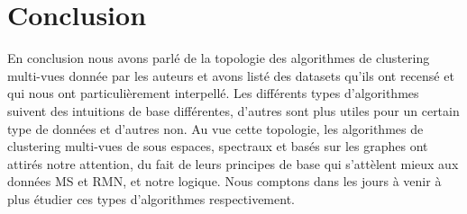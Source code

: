 \documentclass[12pt, french, latin.medieval, a4paper]{report}
\begin{document}
    \section{Conclusion}
    En conclusion nous avons parlé de la topologie des algorithmes de clustering multi-vues donnée par les auteurs et avons listé des datasets qu'ils ont recensé et qui nous ont particulièrement interpellé. Les différents types d'algorithmes suivent des intuitions de base différentes, d'autres sont plus utiles pour un certain type de données et d'autres non. Au vue cette topologie, les algorithmes de clustering multi-vues de sous espaces, spectraux et basés sur les graphes ont attirés notre attention, du fait de leurs principes de base qui s'attèlent mieux aux données MS et RMN, et notre logique. Nous comptons dans les jours à venir à plus étudier ces types d'algorithmes respectivement.
   

    
\end{document}
